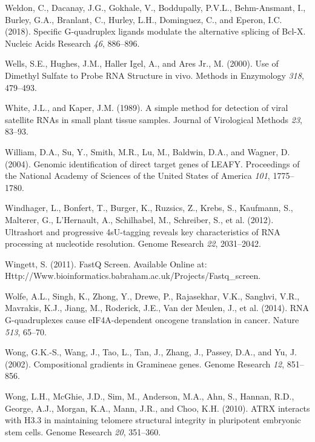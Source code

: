 \documentclass[12pt,a4paper,]{report}
\begin{document}
\leavevmode\hypertarget{ref-Weldon2018}{}%
Weldon, C., Dacanay, J.G., Gokhale, V., Boddupally, P.V.L.,
Behm-Ansmant, I., Burley, G.A., Branlant, C., Hurley, L.H., Dominguez,
C., and Eperon, I.C. (2018). Specific G-quadruplex ligands modulate the
alternative splicing of Bcl-X. Nucleic Acids Research \emph{46},
886--896.

\leavevmode\hypertarget{ref-Wells2000}{}%
Wells, S.E., Hughes, J.M., Haller Igel, A., and Ares Jr., M. (2000). Use
of Dimethyl Sulfate to Probe RNA Structure in vivo. Methods in
Enzymology \emph{318}, 479--493.

\leavevmode\hypertarget{ref-White1989}{}%
White, J.L., and Kaper, J.M. (1989). A simple method for detection of
viral satellite RNAs in small plant tissue samples. Journal of
Virological Methods \emph{23}, 83--93.

\leavevmode\hypertarget{ref-William2003}{}%
William, D.A., Su, Y., Smith, M.R., Lu, M., Baldwin, D.A., and Wagner,
D. (2004). Genomic identification of direct target genes of LEAFY.
Proceedings of the National Academy of Sciences of the United States of
America \emph{101}, 1775--1780.

\leavevmode\hypertarget{ref-Windhager2012}{}%
Windhager, L., Bonfert, T., Burger, K., Ruzsics, Z., Krebs, S.,
Kaufmann, S., Malterer, G., L'Hernault, A., Schilhabel, M., Schreiber,
S., et al. (2012). Ultrashort and progressive 4sU-tagging reveals key
characteristics of RNA processing at nucleotide resolution. Genome
Research \emph{22}, 2031--2042.

\leavevmode\hypertarget{ref-Wingett2011}{}%
Wingett, S. (2011). FastQ Screen. Available Online at:
Http://Www.bioinformatics.babraham.ac.uk/Projects/Fastq\_screen.

\leavevmode\hypertarget{ref-Wolfe2014}{}%
Wolfe, A.L., Singh, K., Zhong, Y., Drewe, P., Rajasekhar, V.K., Sanghvi,
V.R., Mavrakis, K.J., Jiang, M., Roderick, J.E., Van der Meulen, J., et
al. (2014). RNA G-quadruplexes cause eIF4A-dependent oncogene
translation in cancer. Nature \emph{513}, 65--70.

\leavevmode\hypertarget{ref-Wong2002}{}%
Wong, G.K.-S., Wang, J., Tao, L., Tan, J., Zhang, J., Passey, D.A., and
Yu, J. (2002). Compositional gradients in Gramineae genes. Genome
Research \emph{12}, 851--856.

\leavevmode\hypertarget{ref-Wong2010}{}%
Wong, L.H., McGhie, J.D., Sim, M., Anderson, M.A., Ahn, S., Hannan,
R.D., George, A.J., Morgan, K.A., Mann, J.R., and Choo, K.H. (2010).
ATRX interacts with H3.3 in maintaining telomere structural integrity in
pluripotent embryonic stem cells. Genome Research \emph{20}, 351--360.
\end{document}
